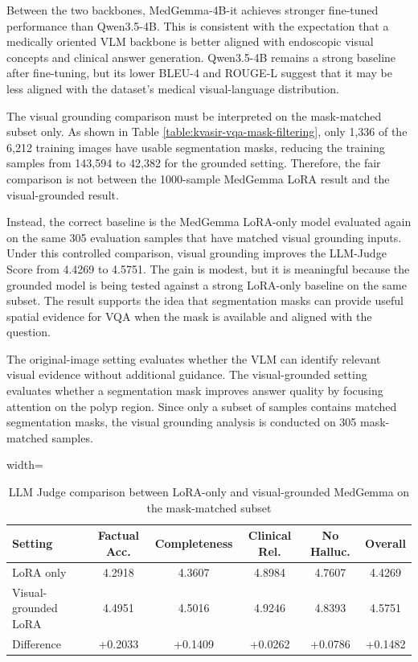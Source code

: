 Between the two backbones, MedGemma-4B-it achieves stronger fine-tuned performance than Qwen3.5-4B. This is consistent with the expectation that a medically oriented VLM backbone is better aligned with endoscopic visual concepts and clinical answer generation. Qwen3.5-4B remains a strong baseline after fine-tuning, but its lower BLEU-4 and ROUGE-L suggest that it may be less aligned with the dataset's medical visual-language distribution.

The visual grounding comparison must be interpreted on the mask-matched subset only. As shown in Table \ref{table:kvasir-vqa-mask-filtering}, only 1,336 of the 6,212 training images have usable segmentation masks, reducing the training samples from 143,594 to 42,382 for the grounded setting. Therefore, the fair comparison is not between the 1000-sample MedGemma LoRA result and the visual-grounded result.

Instead, the correct baseline is the MedGemma LoRA-only model evaluated again on the same 305 evaluation samples that have matched visual grounding inputs. Under this controlled comparison, visual grounding improves the LLM-Judge Score from 4.4269 to 4.5751. The gain is modest, but it is meaningful because the grounded model is being tested against a strong LoRA-only baseline on the same subset. The result supports the idea that segmentation masks can provide useful spatial evidence for VQA when the mask is available and aligned with the question.

The original-image setting evaluates whether the VLM can identify relevant visual evidence without additional guidance. The visual-grounded setting evaluates whether a segmentation mask improves answer quality by focusing attention on the polyp region. Since only a subset of samples contains matched segmentation masks, the visual grounding analysis is conducted on 305 mask-matched samples.

\begin{table}[H]
\centering
\begin{adjustbox}{width=\textwidth}
\begin{tabular}{l c c c c c}
\hline\hline
Setting & Factual Acc. & Completeness & Clinical Rel. & No Halluc. & Overall \\
\hline
LoRA only & 4.2918 & 4.3607 & 4.8984 & 4.7607 & 4.4269 \\
Visual-grounded LoRA & 4.4951 & 4.5016 & 4.9246 & 4.8393 & 4.5751 \\
Difference & +0.2033 & +0.1409 & +0.0262 & +0.0786 & +0.1482 \\
\hline\hline
\end{tabular}
\end{adjustbox}
\caption{LLM Judge comparison between LoRA-only and visual-grounded MedGemma on the mask-matched subset}
\label{table:polyp-vqa-llm-judge-grounding}
\end{table}

